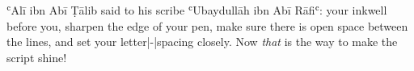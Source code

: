 ʿAlī ibn Abī Ṭālib said to his scribe ʿUbaydullāh ibn Abī Rāfiʿ:
your inkwell before you, sharpen the edge of your pen, make sure
there is open space between the lines, and set your letter|-|spacing
closely. Now {\em that} is the way to make the script shine!

